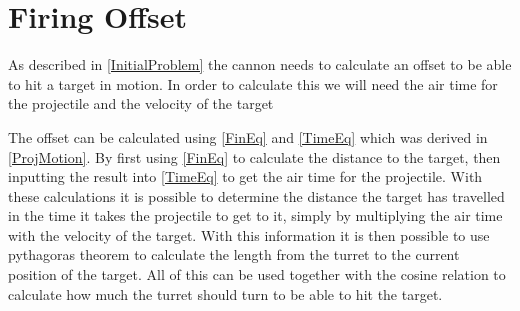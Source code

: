 \section{Firing Offset}
As described in \autoref{InitialProblem} the cannon needs to calculate an
offset to be able to hit a target in motion. In order to calculate this we will
need the air time for the projectile and the velocity of the target\nl

The offset can be calculated using \autoref{FinEq} and \autoref{TimeEq} which
was derived in \autoref{ProjMotion}. By first using \autoref{FinEq} to
calculate the distance to the target, then inputting the result into
\autoref{TimeEq} to get the air time for the projectile. With these calculations
it is possible to determine the distance the target has travelled in the time it
takes the projectile to get to it, simply by multiplying the air time with the
velocity of the target. With this information it is then possible to use
pythagoras theorem to calculate the length from the turret to the current
position of the target. All of this can be used together with the cosine
relation to calculate how much the turret should turn to be able to hit the
target.
